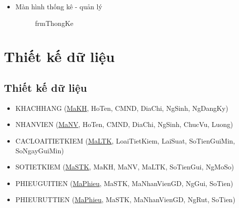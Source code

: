\documentclass{article}
\begin{document}
\begin{enumerate}
\begin{itemize}
					\newpage
					\item Màn hình thống kê - quản lý
						\begin{figure}[!h]
							\setlength\fboxsep{1pt}
							\setlength\fboxrule{1pt}
							\caption{frmThongKe}
							\label{fig:frmThongKe}
						\end{figure}
				\end{itemize}
			
		\end{enumerate}
	
	
	\section{Thiết kế dữ liệu}
		\subsection{Thiết kế dữ liệu}
			\begin{itemize}
				\item KHACHHANG (\underline{MaKH}, HoTen, CMND, DiaChi, NgSinh, NgDangKy)
				\item NHANVIEN (\underline{MaNV}, HoTen, CMND, DiaChi, NgSinh, ChucVu, Luong)
				\item CACLOAITIETKIEM (\underline{MaLTK}, LoaiTietKiem, LaiSuat, SoTienGuiMin, SoNgayGuiMin)
				\item SOTIETKIEM (\underline{MaSTK}, MaKH, MaNV, MaLTK, SoTienGui, NgMoSo)
				\item PHIEUGUITIEN (\underline{MaPhieu}, MaSTK, MaNhanVienGD, NgGui, SoTien)
				\item PHIEURUTTIEN (\underline{MaPhieu}, MaSTK, MaNhanVienGD, NgRut, SoTien)
			\end{itemize}
			
\end{document}

